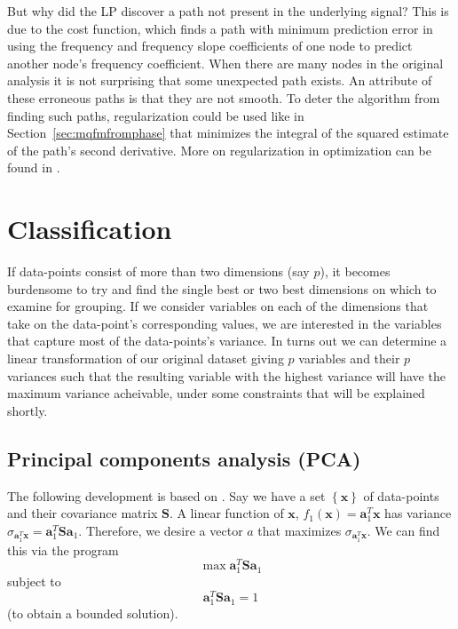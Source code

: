But why did the LP discover a path not present in the underlying signal? This is
due to the cost function, which finds a path with minimum prediction error in
using the frequency and frequency slope coefficients of one node to predict
another node's frequency coefficient. When there are many nodes in the original
analysis it is not surprising that some unexpected path exists.  An attribute of
these erroneous paths is that they are not smooth. To deter the algorithm from
finding such paths, regularization could be used like in
Section~\ref{sec:mqfmfromphase} that minimizes the integral of the squared
estimate of the path's second derivative. More on regularization in optimization
can be found in \cite[ch.~6.3]{boyd2004convex}.


\section{Classification}

If data-points consist of more than two dimensions (say $p$), it becomes
burdensome to try and find the single best or two best dimensions on which to
examine for grouping. If we consider variables on each of the dimensions that
take on the data-point's corresponding values, we are interested in the
variables that capture most of the data-points's variance. In turns out we can
determine a linear transformation of our original dataset giving $p$ variables
and their $p$ variances such that the resulting variable with the highest
variance will have the maximum variance acheivable, under some constraints that
will be explained shortly. 

\subsection{Principal components analysis (PCA)}

The following development is based on \cite{jolliffe2002principal}. Say we have
a set $\left\{ \boldsymbol{x} \right\}$ of data-points and their covariance
matrix $\boldsymbol{S}$. A linear function of $\boldsymbol{x}$,
$f_1(\boldsymbol{x})=\boldsymbol{a}_{1}^{T}\boldsymbol{x}$ has variance
$\sigma_{\boldsymbol{a}_{1}^{T}\boldsymbol{x}}=\boldsymbol{a}_{1}^{T}\boldsymbol{S}\boldsymbol{a}_{1}$.
Therefore, we desire a vector $a$ that maximizes
$\sigma_{\boldsymbol{a}_{1}^{T}\boldsymbol{x}}$. We can find this via the program
\[
        \max \boldsymbol{a}_{1}^{T}\boldsymbol{S}\boldsymbol{a}_{1}
\]
subject to
\[
    \boldsymbol{a}_{1}^{T}\boldsymbol{S}\boldsymbol{a}_{1}=1
\]
(to obtain a bounded solution).

